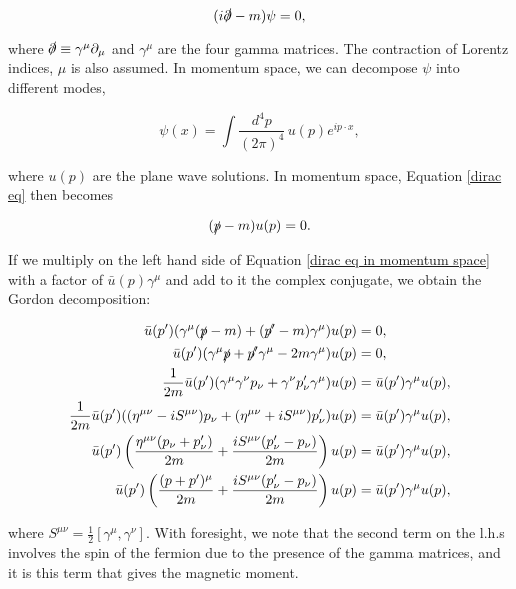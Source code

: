 \documentclass{article}
\numberwithin{equation}{section} %
\begin{document}
\begin{equation}
(i\slashed{\partial} -m)\psi=0,
\label{dirac eq}
\end{equation}

\noindent where $\slashed{\partial} \equiv \gamma^\mu\partial_\mu$ and $\gamma^\mu$ are the four gamma matrices. The contraction of Lorentz indices, $\mu$ is also assumed. In momentum space, we can decompose $\psi$ into different modes,

\begin{equation}
\psi(x) = \int \frac{d^4p}{(2\pi)^4} \, u(p) e^{ip\cdot x},
\end{equation}

\noindent where $u(p)$ are the plane wave solutions\cite{tong}. In momentum space, Equation \ref{dirac eq} then becomes

\begin{equation}
(\slashed{p} - m)u(p) = 0.
\label{dirac eq in momentum space}
\end{equation}

\noindent If we multiply on the left hand side of Equation \ref{dirac eq in momentum space} with a factor of $\bar{u}(p)\gamma^\mu$ and add to it the complex conjugate, we obtain the Gordon decomposition:

\begin{equation}
\begin{split}
\bar{u}(p')(\gamma^\mu(\slashed{p}-m) + (\slashed{p'}-m)\gamma^\mu)u(p) &= 0,\\
\bar{u}(p')(\gamma^\mu\slashed{p} + \slashed{p'}\gamma^\mu- 2m\gamma^\mu)u(p) &= 0,\\
\frac{1}{2m}\bar{u}(p')(\gamma^\mu\gamma^\nu p_\nu + \gamma^\nu p'_\nu\gamma^\mu)u(p) &= \bar{u}(p')\gamma^\mu u(p),\\
\frac{1}{2m}\bar{u}(p')( (\eta^{\mu\nu} - iS^{\mu\nu})p_\nu + (\eta^{\mu\nu} + iS^{\mu\nu}) p'_\nu)u(p) &= \bar{u}(p')\gamma^\mu u(p),\\
\bar{u}(p')\left( \frac{\eta^{\mu\nu}(p_\nu + p'_\nu)}{2m} + \frac{iS^{\mu\nu}(p'_\nu - p_\nu)}{2m} \right)u(p) &= \bar{u}(p')\gamma^\mu u(p),\\
\bar{u}(p')\left( \frac{(p + p')^\mu}{2m} + \frac{iS^{\mu\nu}(p'_\nu - p_\nu)}{2m} \right)u(p) &= \bar{u}(p')\gamma^\mu u(p),
\end{split}
\label{gordon decomposition}
\end{equation}

\noindent where $S^{\mu\nu} = \frac{1}{2}[\gamma^\mu,\gamma^\nu]$. With foresight\cite{zee}, we note that the second term on the l.h.s involves the spin of the fermion due to the presence of the gamma matrices, and it is this term that gives the magnetic moment.
\end{document}
